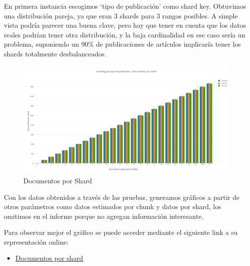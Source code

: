 En primera instancia escogimos `tipo de publicación' como shard key. Obtuvimos una distribución pareja, ya que eran 3 shards
para 3 rangos posibles. A simple vista podría parecer una buena clave, pero hay que tener en cuenta que los datos reales
podrían tener otra distribución, y la baja cardinalidad en ese caso sería un problema, suponiendo un 90\% de publicaciones de artículos 
implicaría tener los shards totalmente desbalanceados.

\begin{figure}[h!]
 \centering
 \includegraphics[scale=0.3,keepaspectratio=true]{./ShardingPorTipoDePublicacion-DocumentosPorShard.png}
 \caption{Documentos por Shard}
\end{figure}
 
Con los datos obtenidos a través de las pruebas, generamos gráficos a partir de otros parámetros como datos estimados por chunk y datos por shard, los omitimos en el
informe porque no agregan información interesante.

Para observar mejor el gráfico se puede acceder mediante el siguiente link a su representación online:
\begin{itemize}
 \item \href{https://plot.ly/~fzanollo/13/sharding-por-tipo-de-publicacion-documentos-por-shard/}{Documentos por shard}
\end{itemize}